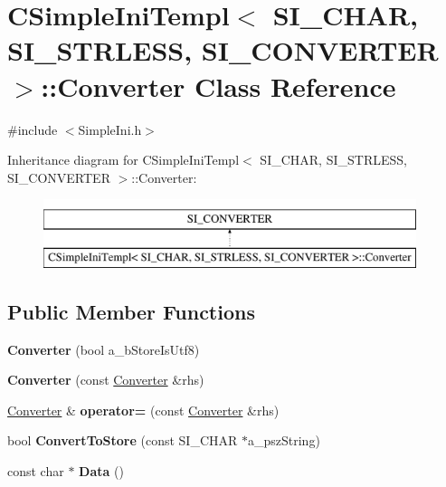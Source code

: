 \hypertarget{a00010}{}\section{C\+Simple\+Ini\+Templ$<$ S\+I\+\_\+\+C\+H\+A\+R, S\+I\+\_\+\+S\+T\+R\+L\+E\+S\+S, S\+I\+\_\+\+C\+O\+N\+V\+E\+R\+T\+E\+R $>$\+:\+:Converter Class Reference}
\label{a00010}


{\ttfamily \#include $<$Simple\+Ini.\+h$>$}

Inheritance diagram for C\+Simple\+Ini\+Templ$<$ S\+I\+\_\+\+C\+H\+A\+R, S\+I\+\_\+\+S\+T\+R\+L\+E\+S\+S, S\+I\+\_\+\+C\+O\+N\+V\+E\+R\+T\+E\+R $>$\+:\+:Converter\+:\begin{figure}[H]
\begin{center}
\leavevmode
\includegraphics[height=2.000000cm]{a00010}
\end{center}
\end{figure}
\subsection*{Public Member Functions}
\begin{DoxyCompactItemize}
\item 
\hypertarget{a00010_ab8e740b211e4ece127d4d25773ba7e42}{}{\bfseries Converter} (bool a\+\_\+b\+Store\+Is\+Utf8)\label{a00010_ab8e740b211e4ece127d4d25773ba7e42}

\item 
\hypertarget{a00010_a2f6e993014ed5d60c6e890e55beb0805}{}{\bfseries Converter} (const \hyperlink{a00010}{Converter} \&rhs)\label{a00010_a2f6e993014ed5d60c6e890e55beb0805}

\item 
\hypertarget{a00010_af858c01c6a7e4ce9fafd18abc9e0ac1b}{}\hyperlink{a00010}{Converter} \& {\bfseries operator=} (const \hyperlink{a00010}{Converter} \&rhs)\label{a00010_af858c01c6a7e4ce9fafd18abc9e0ac1b}

\item 
\hypertarget{a00010_a4e4186867214b54326cf622e323c9f2f}{}bool {\bfseries Convert\+To\+Store} (const S\+I\+\_\+\+C\+H\+A\+R $\ast$a\+\_\+psz\+String)\label{a00010_a4e4186867214b54326cf622e323c9f2f}

\item 
\hypertarget{a00010_a918bbd4f861a2872e148bc9481ac80bb}{}const char $\ast$ {\bfseries Data} ()\label{a00010_a918bbd4f861a2872e148bc9481ac80bb}

\end{DoxyCompactItemize}


